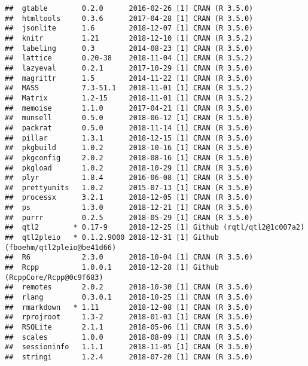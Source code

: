 \documentclass[oneside]{book}
\begin{document}
\begin{verbatim}
##  gtable        0.2.0      2016-02-26 [1] CRAN (R 3.5.0)                   
##  htmltools     0.3.6      2017-04-28 [1] CRAN (R 3.5.0)                   
##  jsonlite      1.6        2018-12-07 [1] CRAN (R 3.5.0)                   
##  knitr         1.21       2018-12-10 [1] CRAN (R 3.5.2)                   
##  labeling      0.3        2014-08-23 [1] CRAN (R 3.5.0)                   
##  lattice       0.20-38    2018-11-04 [1] CRAN (R 3.5.2)                   
##  lazyeval      0.2.1      2017-10-29 [1] CRAN (R 3.5.0)                   
##  magrittr      1.5        2014-11-22 [1] CRAN (R 3.5.0)                   
##  MASS          7.3-51.1   2018-11-01 [1] CRAN (R 3.5.2)                   
##  Matrix        1.2-15     2018-11-01 [1] CRAN (R 3.5.2)                   
##  memoise       1.1.0      2017-04-21 [1] CRAN (R 3.5.0)                   
##  munsell       0.5.0      2018-06-12 [1] CRAN (R 3.5.0)                   
##  packrat       0.5.0      2018-11-14 [1] CRAN (R 3.5.0)                   
##  pillar        1.3.1      2018-12-15 [1] CRAN (R 3.5.0)                   
##  pkgbuild      1.0.2      2018-10-16 [1] CRAN (R 3.5.0)                   
##  pkgconfig     2.0.2      2018-08-16 [1] CRAN (R 3.5.0)                   
##  pkgload       1.0.2      2018-10-29 [1] CRAN (R 3.5.0)                   
##  plyr          1.8.4      2016-06-08 [1] CRAN (R 3.5.0)                   
##  prettyunits   1.0.2      2015-07-13 [1] CRAN (R 3.5.0)                   
##  processx      3.2.1      2018-12-05 [1] CRAN (R 3.5.0)                   
##  ps            1.3.0      2018-12-21 [1] CRAN (R 3.5.0)                   
##  purrr         0.2.5      2018-05-29 [1] CRAN (R 3.5.0)                   
##  qtl2        * 0.17-9     2018-12-25 [1] Github (rqtl/qtl2@1c007a2)       
##  qtl2pleio   * 0.1.2.9000 2018-12-31 [1] Github (fboehm/qtl2pleio@be41d66)
##  R6            2.3.0      2018-10-04 [1] CRAN (R 3.5.0)                   
##  Rcpp          1.0.0.1    2018-12-28 [1] Github (RcppCore/Rcpp@0c9f683)   
##  remotes       2.0.2      2018-10-30 [1] CRAN (R 3.5.0)                   
##  rlang         0.3.0.1    2018-10-25 [1] CRAN (R 3.5.0)                   
##  rmarkdown   * 1.11       2018-12-08 [1] CRAN (R 3.5.0)                   
##  rprojroot     1.3-2      2018-01-03 [1] CRAN (R 3.5.0)                   
##  RSQLite       2.1.1      2018-05-06 [1] CRAN (R 3.5.0)                   
##  scales        1.0.0      2018-08-09 [1] CRAN (R 3.5.0)                   
##  sessioninfo   1.1.1      2018-11-05 [1] CRAN (R 3.5.0)                   
##  stringi       1.2.4      2018-07-20 [1] CRAN (R 3.5.0)                   

\end{verbatim}
\end{document}
